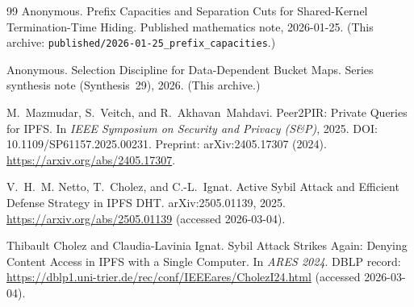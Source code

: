 \documentclass[11pt]{article}
\begin{document}
\begin{thebibliography}{99}
Anonymous.
\newblock Prefix Capacities and Separation Cuts for Shared-Kernel Termination-Time Hiding.
\newblock Published mathematics note, 2026-01-25. (This archive: \texttt{published/2026-01-25\_prefix\_capacities}.)

Anonymous.
\newblock Selection Discipline for Data-Dependent Bucket Maps.
\newblock Series synthesis note (Synthesis~29), 2026. (This archive.)

M.~Mazmudar, S.~Veitch, and R.~Akhavan~Mahdavi.
\newblock Peer2PIR: Private Queries for {IPFS}.
\newblock In \emph{IEEE Symposium on Security and Privacy (S\&P)}, 2025.
\newblock DOI: 10.1109/SP61157.2025.00231.
\newblock Preprint: arXiv:2405.17307 (2024).
\newblock \url{https://arxiv.org/abs/2405.17307}.

V.~H.~M. Netto, T.~Cholez, and C.-L.~Ignat.
\newblock Active Sybil Attack and Efficient Defense Strategy in IPFS DHT.
\newblock arXiv:2505.01139, 2025. \url{https://arxiv.org/abs/2505.01139} (accessed 2026-03-04).

Thibault Cholez and Claudia-Lavinia Ignat.
\newblock Sybil Attack Strikes Again: Denying Content Access in IPFS with a Single Computer.
\newblock In \emph{ARES 2024}. DBLP record: \url{https://dblp1.uni-trier.de/rec/conf/IEEEares/CholezI24.html} (accessed 2026-03-04).

\end{thebibliography}
\end{document}

